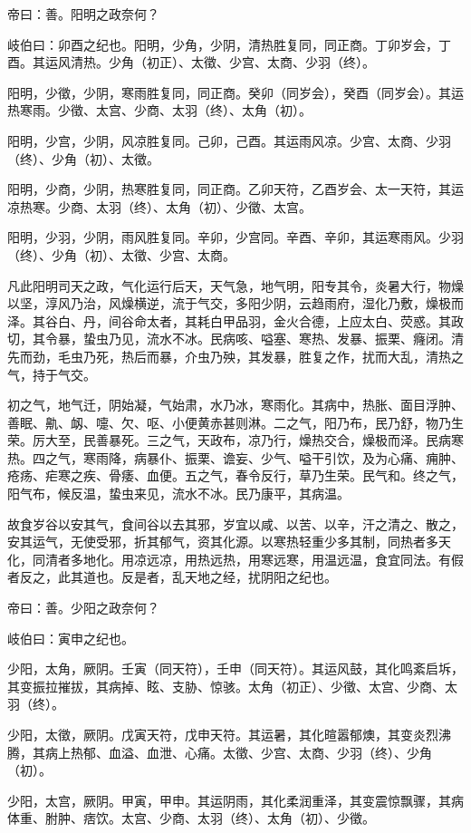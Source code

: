 \documentclass{article}%
\begin{document}
帝曰：善。阳明之政奈何？

岐伯曰：卯酉之纪也。阳明，少角，少阴，清热胜复同，同正商。丁卯岁会，丁酉。其运风清热。少角（初正）、太徵、少宫、太商、少羽（终）。

阳明，少徵，少阴，寒雨胜复同，同正商。癸卯（同岁会），癸酉（同岁会）。其运热寒雨。少徵、太宫、少商、太羽（终）、太角（初）。

阳明，少宫，少阴，风凉胜复同。己卯，己酉。其运雨风凉。少宫、太商、少羽（终）、少角（初）、太徵。

阳明，少商，少阴，热寒胜复同，同正商。乙卯天符，乙酉岁会、太一天符，其运凉热寒。少商、太羽（终）、太角（初）、少徵、太宫。

阳明，少羽，少阴，雨风胜复同。辛卯，少宫同。辛酉、辛卯，其运寒雨风。少羽（终）、少角（初）、太徵、少宫、太商。

凡此阳明司天之政，气化运行后天，天气急，地气明，阳专其令，炎暑大行，物燥以坚，淳风乃治，风燥横逆，流于气交，多阳少阴，云趋雨府，湿化乃敷，燥极而泽。其谷白、丹，间谷命太者，其耗白甲品羽，金火合德，上应太白、荧惑。其政切，其令暴，蛰虫乃见，流水不冰。民病咳、嗌塞、寒热、发暴、振栗、癃闭。清先而劲，毛虫乃死，热后而暴，介虫乃殃，其发暴，胜复之作，扰而大乱，清热之气，持于气交。

初之气，地气迁，阴始凝，气始肃，水乃冰，寒雨化。其病中，热胀、面目浮肿、善眠、鼽、衂、嚏、欠、呕、小便黄赤甚则淋。二之气，阳乃布，民乃舒，物乃生荣。厉大至，民善暴死。三之气，天政布，凉乃行，燥热交合，燥极而泽。民病寒热。四之气，寒雨降，病暴仆、振栗、谵妄、少气、嗌干引饮，及为心痛、痈肿、疮疡、疟寒之疾、骨痿、血便。五之气，春令反行，草乃生荣。民气和。终之气，阳气布，候反温，蛰虫来见，流水不冰。民乃康平，其病温。

故食岁谷以安其气，食间谷以去其邪，岁宜以咸、以苦、以辛，汗之清之、散之，安其运气，无使受邪，折其郁气，资其化源。以寒热轻重少多其制，同热者多天化，同清者多地化。用凉远凉，用热远热，用寒远寒，用温远温，食宜同法。有假者反之，此其道也。反是者，乱天地之经，扰阴阳之纪也。

帝曰：善。少阳之政奈何？

岐伯曰：寅申之纪也。

少阳，太角，厥阴。壬寅（同天符），壬申（同天符）。其运风鼓，其化鸣紊启坼，其变振拉摧拔，其病掉、眩、支胁、惊骇。太角（初正）、少徵、太宫、少商、太羽（终）。

少阳，太徵，厥阴。戊寅天符，戊申天符。其运暑，其化暄嚣郁燠，其变炎烈沸腾，其病上热郁、血溢、血泄、心痛。太徵、少宫、太商、少羽（终）、少角（初）。

少阳，太宫，厥阴。甲寅，甲申。其运阴雨，其化柔润重泽，其变震惊飘骤，其病体重、胕肿、痞饮。太宫、少商、太羽（终）、太角（初）、少徵。
\end{document}

